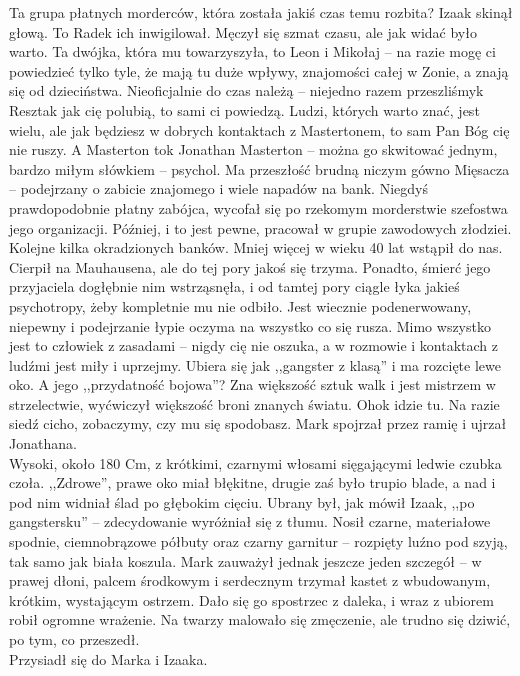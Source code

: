 \documentclass[../MAIN.tex]{subfiles}
\begin{document}
\xx Ta grupa płatnych morderców, która została jakiś czas temu rozbita?
\qd
Izaak skinął głową.
%
\sx To Radek ich inwigilował. Męczył się szmat czasu, ale jak widać było warto. Ta dwójka, która mu towarzyszyła, to Leon i Mikołaj -- na razie mogę ci powiedzieć tylko tyle, że mają tu duże wpływy, znajomości całej w Zonie, a znają się od dzieciństwa. Nieoficjalnie do czas należą -- niejedno razem przeszliśmy\3k Reszta\3k jak cię polubią, to sami ci powiedzą. Ludzi, których warto znać, jest wielu, ale jak będziesz w dobrych kontaktach z Mastertonem, to sam Pan Bóg cię nie ruszy.
\xx A Masterton to\3k
\xx Jonathan Masterton -- można go skwitować jednym, bardzo miłym słówkiem -- psychol. Ma przeszłość brudną niczym gówno Mięsacza -- podejrzany o zabicie znajomego i wiele napadów na bank. Niegdyś prawdopodobnie płatny zabójca, wycofał się po rzekomym morderstwie szefostwa jego organizacji. Później, i to jest pewne, pracował w grupie zawodowych złodziei. Kolejne kilka okradzionych banków. Mniej więcej w wieku 40 lat wstąpił do nas. Cierpił na Mauhausena, ale do tej pory jakoś się trzyma. Ponadto, śmierć jego przyjaciela dogłębnie nim wstrząsnęła, i od tamtej pory ciągle łyka jakieś psychotropy, żeby kompletnie mu nie odbiło. Jest wiecznie podenerwowany, niepewny i podejrzanie łypie oczyma na wszystko co się rusza. Mimo wszystko jest to człowiek z zasadami -- nigdy cię nie oszuka, a w rozmowie i kontaktach z ludźmi jest miły i uprzejmy. Ubiera się jak ,,gangster z klasą'' i ma rozcięte lewe oko.
\xx A jego ,,przydatność bojowa''?
\xx Zna większość sztuk walk i jest mistrzem w strzelectwie, wyćwiczył większość broni znanych światu. Oho\3k idzie tu. Na razie siedź cicho, zobaczymy, czy mu się spodobasz.
\qd
Mark spojrzał przez ramię i ujrzał Jonathana. \\
Wysoki, około 180 Cm, z krótkimi, czarnymi włosami sięgającymi ledwie czubka czoła. ,,Zdrowe'', prawe oko miał błękitne, drugie zaś było trupio blade, a nad i pod nim widniał ślad po głębokim cięciu. Ubrany był, jak mówił Izaak, ,,po gangstersku'' -- zdecydowanie wyróżniał się z tłumu. Nosił czarne, materiałowe spodnie, ciemnobrązowe półbuty oraz czarny garnitur -- rozpięty luźno pod szyją, tak samo jak biała koszula. Mark zauważył jednak jeszcze jeden szczegół -- w prawej dłoni, palcem środkowym i serdecznym trzymał kastet z wbudowanym, krótkim, wystającym ostrzem. Dało się go spostrzec z daleka, i wraz z ubiorem robił ogromne wrażenie. Na twarzy malowało się zmęczenie, ale trudno się dziwić, po tym, co przeszedł. \\
Przysiadł się do Marka i Izaaka.
\end{document}
